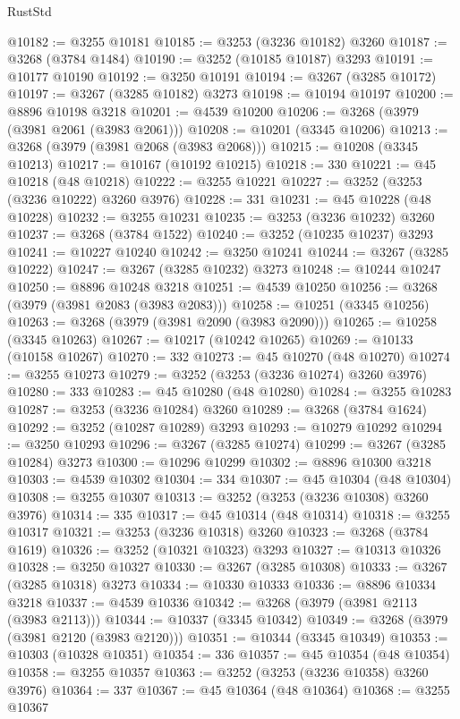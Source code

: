 \begin{lexlean}{RustStd}
\begin{coremodule}
@10182 := @3255 @10181
@10185 := @3253 (@3236 @10182) @3260
@10187 := @3268 (@3784 @1484)
@10190 := @3252 (@10185 @10187) @3293
@10191 := @10177 @10190
@10192 := @3250 @10191
@10194 := @3267 (@3285 @10172)
@10197 := @3267 (@3285 @10182) @3273
@10198 := @10194 @10197
@10200 := @8896 @10198 @3218
@10201 := @4539 @10200
@10206 := @3268 (@3979 (@3981 @2061 (@3983 @2061)))
@10208 := @10201 (@3345 @10206)
@10213 := @3268 (@3979 (@3981 @2068 (@3983 @2068)))
@10215 := @10208 (@3345 @10213)
@10217 := @10167 (@10192 @10215)
@10218 := 330
@10221 := @45 @10218 (@48 @10218)
@10222 := @3255 @10221
@10227 := @3252 (@3253 (@3236 @10222) @3260 @3976)
@10228 := 331
@10231 := @45 @10228 (@48 @10228)
@10232 := @3255 @10231
@10235 := @3253 (@3236 @10232) @3260
@10237 := @3268 (@3784 @1522)
@10240 := @3252 (@10235 @10237) @3293
@10241 := @10227 @10240
@10242 := @3250 @10241
@10244 := @3267 (@3285 @10222)
@10247 := @3267 (@3285 @10232) @3273
@10248 := @10244 @10247
@10250 := @8896 @10248 @3218
@10251 := @4539 @10250
@10256 := @3268 (@3979 (@3981 @2083 (@3983 @2083)))
@10258 := @10251 (@3345 @10256)
@10263 := @3268 (@3979 (@3981 @2090 (@3983 @2090)))
@10265 := @10258 (@3345 @10263)
@10267 := @10217 (@10242 @10265)
@10269 := @10133 (@10158 @10267)
@10270 := 332
@10273 := @45 @10270 (@48 @10270)
@10274 := @3255 @10273
@10279 := @3252 (@3253 (@3236 @10274) @3260 @3976)
@10280 := 333
@10283 := @45 @10280 (@48 @10280)
@10284 := @3255 @10283
@10287 := @3253 (@3236 @10284) @3260
@10289 := @3268 (@3784 @1624)
@10292 := @3252 (@10287 @10289) @3293
@10293 := @10279 @10292
@10294 := @3250 @10293
@10296 := @3267 (@3285 @10274)
@10299 := @3267 (@3285 @10284) @3273
@10300 := @10296 @10299
@10302 := @8896 @10300 @3218
@10303 := @4539 @10302
@10304 := 334
@10307 := @45 @10304 (@48 @10304)
@10308 := @3255 @10307
@10313 := @3252 (@3253 (@3236 @10308) @3260 @3976)
@10314 := 335
@10317 := @45 @10314 (@48 @10314)
@10318 := @3255 @10317
@10321 := @3253 (@3236 @10318) @3260
@10323 := @3268 (@3784 @1619)
@10326 := @3252 (@10321 @10323) @3293
@10327 := @10313 @10326
@10328 := @3250 @10327
@10330 := @3267 (@3285 @10308)
@10333 := @3267 (@3285 @10318) @3273
@10334 := @10330 @10333
@10336 := @8896 @10334 @3218
@10337 := @4539 @10336
@10342 := @3268 (@3979 (@3981 @2113 (@3983 @2113)))
@10344 := @10337 (@3345 @10342)
@10349 := @3268 (@3979 (@3981 @2120 (@3983 @2120)))
@10351 := @10344 (@3345 @10349)
@10353 := @10303 (@10328 @10351)
@10354 := 336
@10357 := @45 @10354 (@48 @10354)
@10358 := @3255 @10357
@10363 := @3252 (@3253 (@3236 @10358) @3260 @3976)
@10364 := 337
@10367 := @45 @10364 (@48 @10364)
@10368 := @3255 @10367

\end{coremodule}
\end{lexlean}
